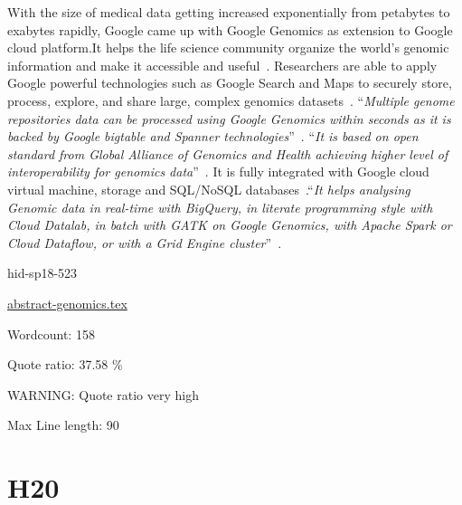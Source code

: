 With the size of medical data getting increased exponentially from 
petabytes to exabytes rapidly, Google came up with Google Genomics 
as extension to Google cloud platform.It helps the life science 
community organize the world's genomic information and make it 
accessible and useful~\cite{hid-sp18-523-www-genomics}. 
Researchers are able to apply Google powerful technologies such as 
Google Search and Maps to securely store, process, explore, and share 
large, complex genomics datasets~\cite{hid-sp18-523-www-genomics}.
\color{blue}``\emph{Multiple genome repositories data can be processed using Google 
Genomics within seconds as it is backed by Google bigtable and 
Spanner technologies}''\color{black}~\cite{hid-sp18-523-www-genomics}. 
\color{blue}``\emph{It is based on open standard from Global Alliance of Genomics and 
Health achieving higher level of interoperability for genomics 
data}''\color{black}~\cite{hid-sp18-523-www-genomics}. It is fully integrated with 
Google cloud virtual machine, storage and SQL/NoSQL 
databases~\cite{hid-sp18-523-www-genomics}.\color{blue}``\emph{It helps analysing Genomic 
data in real-time with BigQuery, in literate programming style 
with Cloud Datalab, in batch with GATK on Google Genomics, with 
Apache Spark or Cloud Dataflow, or with a Grid Engine 
cluster}''\color{black}~\cite{hid-sp18-523-www-genomics}.


\begin{IU}

hid-sp18-523

\href{https://github.com/cloudmesh-community/hid-sp18-523/blob/master//technology/abstract-genomics.tex}{abstract-genomics.tex}

 

Wordcount: 158


Quote ratio: 37.58 \%

WARNING: Quote ratio very high
 
Max Line length: 90
\end{IU}

\section{H20}


